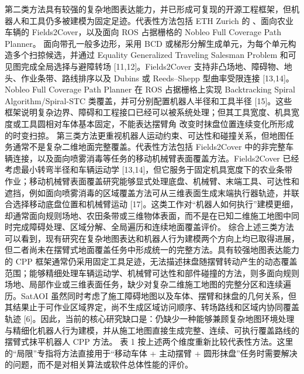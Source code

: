 {}第二类方法具有较强的复杂地图表达能力，并已形成可复现的开源工程框架，但机器人和工具仍多被建模为固定足迹。代表性方法包括 ETH Zurich 的 、面向农业车辆的 Fields2Cover，以及面向 ROS 占据栅格的 Nobleo Full Coverage Path Planner。 面向带孔一般多边形，采用 BCD 或梯形分解生成单元，为每个单元构造多个扫掠候选，并通过 Equality Generalized Traveling Salesman Problem 和可见图完成全局选择与避障转场 [11,12]。Fields2Cover 支持非凸场地、障碍物、地头、作业条带、路线排序以及 Dubins 或 Reeds–Shepp 型曲率受限连接 [13,14]。Nobleo Full Coverage Path Planner 在 ROS 占据栅格上实现 Backtracking Spiral Algorithm/Spiral-STC 类覆盖，并可分别配置机器人半径和工具半径 [15]。这些框架说明复杂边界、障碍和工程接口已经可以被系统处理；但其工具宽度、机具宽度或工具圆相对车体基本固定，不能表达摆臂角 \markdownRendererInlineMath{\phi} 改变时抹盘位置连续变化所形成的时变扫掠。\markdownRendererParagraphSeparator
{}第三类方法更重视机器人运动约束、可达性和碰撞关系，但地图任务通常不是复杂二维地面完整覆盖。代表性方法包括 Fields2Cover 中的非完整车辆连接，以及面向喷雾消毒等任务的移动机械臂表面覆盖方法。Fields2Cover 已经考虑最小转弯半径和车辆运动学 [13,14]，但它服务于固定机具宽度下的农业条带作业；移动机械臂表面覆盖研究能够显式处理底盘、机械臂、末端工具、可达性和遮挡，例如面向喷雾消毒的区域覆盖方法可从三维表面生成末端执行器轨迹，并联合选择移动底盘位置和机械臂运动 [17]。这类工作对“机器人如何执行”建模更细，却通常面向规则场地、农田条带或三维物体表面，而不是在已知二维施工地图中同时完成障碍处理、区域分解、全局遍历和连续地面覆盖评价。\markdownRendererParagraphSeparator
{}综合上述三类方法可以看到，现有研究在复杂地图表达和机器人行为建模两个方向上均已取得进展，但二者尚未在摆臂式地面覆盖任务中形成统一的完整方法。具有较强地图表达能力的 CPP 框架通常仍采用固定工具足迹，无法描述抹盘随摆臂转动产生的动态覆盖范围；能够精细处理车辆运动学、机械臂可达性和部件碰撞的方法，则多面向规则场地、局部作业或三维表面任务，缺少对复杂二维施工地图的完整分区和连续遍历。SatAOI 虽然同时考虑了施工障碍地图以及车体、摆臂和抹盘的几何关系，但其结果止于可作业区域界定，尚不生成区域访问顺序、转场路线和区域内协同覆盖轨迹 [6]。因此，当前的核心研究缺口是：仍缺少一种能够兼顾复杂地图环境处理与精细化机器人行为建模，并从施工地图直接生成完整、连续、可执行覆盖路线的摆臂式抹平机器人 CPP 方法。\markdownRendererParagraphSeparator
{}表 1 按上述两个维度重新比较代表性方法。这里的“局限”专指将方法直接用于“移动车体 + 主动摆臂 + 圆形抹盘”任务时需要解决的问题，而不是对相关算法或软件总体性能的评价。\markdownRendererParagraphSeparator
